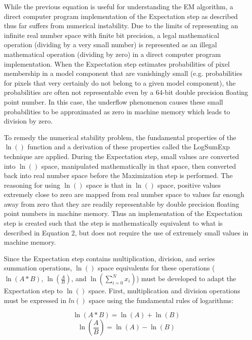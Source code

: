 \documentclass[conference]{IEEEtran}
\begin{document}
\begin{enumerate}
\quad While the previous equation is useful for understanding the EM algorithm, a direct computer program implementation of the Expectation step as described  thus far suffers from numerical instability. Due to the limits of representing an infinite real number space with finite bit precision, a legal mathematical operation (dividing by a very small number) is represented as an illegal mathematical operation (dividing by zero) in a direct computer program implementation. When the Expectation step estimates probabilities of pixel membership in a model component that are vanishingly small (e.g. probabilities for pixels that very certainly do not belong to a given model component), the probabilities are often not representable even by a 64-bit double precision floating point number. In this case, the underflow phenomenon causes these small probabilities to be approximated as zero in machine memory which leads to division by zero. 

\quad To remedy the numerical stability problem, the fundamental properties of the $\ln()$ function and a derivation of these properties called the LogSumExp \cite{LogSumExp} technique are applied. During the Expectation step, small values are converted into $\ln()$ space, manipulated mathematically in that space, then converted back into real number space before the Maximization step is performed. The reasoning for using $\ln()$ space is that in $\ln()$ space, positive values extremely close to zero are mapped from real number space to values far enough away from zero that they are readily representable by double precision floating point numbers in machine memory. Thus an implementation of the Expectation step is created such that the step is mathematically equivalent to what is described in Equation 2, but does not require the use of extremely small values in machine memory.

\quad Since the Expectation step contains multiplication, division, and series summation operations, $\ln()$ space equivalents for these operations ($\ln(A * B)$, $\ln(\frac{A}{B})$, and $\ln(\sum_{i=0}^{N}x_i)$) must be developed to adapt the Expectation step to $\ln()$ space. First, multiplication and division operations must be expressed in $ln()$ space using the fundamental rules of logarithms:

\begin{equation}
    \ln(A * B) = \ln(A) + \ln(B)
\end{equation}
\begin{equation}
    \ln(\frac{A}{B}) = \ln(A) - \ln(B)
\end{equation}


\end{enumerate}
\end{document}
